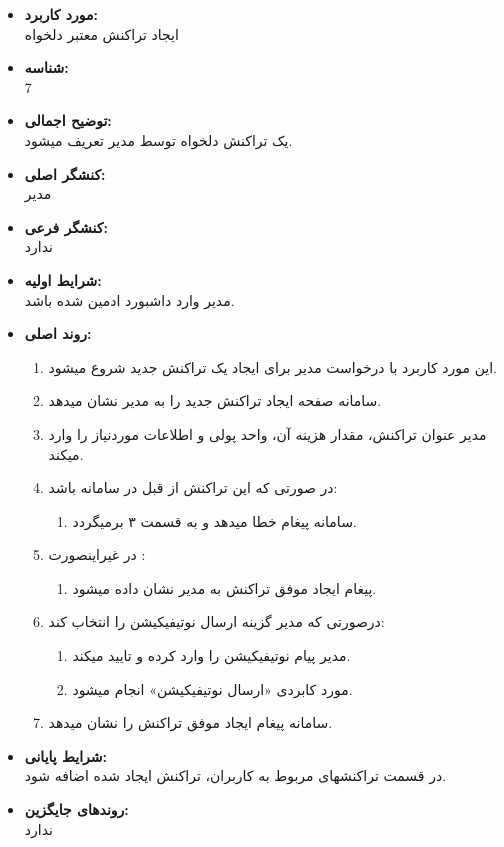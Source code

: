 \documentclass{article}
\begin{document}
\begin{itemize}
\item \textbf{مورد کاربرد:}\\
ایجاد تراکنش معتبر دلخواه
\item \textbf{شناسه:}\\
7
\item \textbf{توضیح اجمالی:}\\
یک تراکنش دلخواه توسط مدیر تعریف میشود.
\item \textbf{کنشگر اصلی:}\\
مدیر
\item \textbf{کنشگر فرعی:}\\
ندارد
\item \textbf{شرایط اولیه:}\\
مدیر وارد داشبورد ادمین شده باشد.
\item \textbf{روند اصلی:}\\
\begin{enumerate}
\item  این مورد کاربرد با درخواست مدیر برای ایجاد یک تراکنش جدید شروع میشود.
\item سامانه صفحه ایجاد تراکنش جدید را به مدیر نشان میدهد.
\item مدیر عنوان تراکنش، مقدار هزینه آن، واحد پولی و اطلاعات موردنیاز را وارد میکند.
\item در صورتی که این تراکنش از قبل در سامانه باشد:
\begin{enumerate}
\item سامانه پیغام خطا میدهد و به قسمت ۳ برمیگردد. 
\end{enumerate}

\item در غیراینصورت	:
\begin{enumerate}
\item پیغام ایجاد موفق تراکنش به مدیر نشان داده میشود.
\end{enumerate}
\item  درصورتی که مدیر گزینه ارسال نوتیفیکیشن را انتخاب کند:
\begin{enumerate}
\item مدیر پیام نوتیفیکیشن را وارد کرده و تایید میکند.
\item مورد کابردی «ارسال نوتیفیکیشن» انجام میشود.
\end{enumerate}
\item سامانه پیغام ایجاد موفق تراکنش را نشان میدهد.
\end{enumerate}

\item \textbf{شرایط پایانی:}\\ 
در قسمت تراکنشهای مربوط به کاربران، تراکنش ایجاد شده اضافه شود.
\item \textbf{روندهای جایگزین:}\\
ندارد
\end{itemize}


\noindent\makebox[\linewidth]{\rule{\paperwidth}{0.4pt}}
\end{document}
